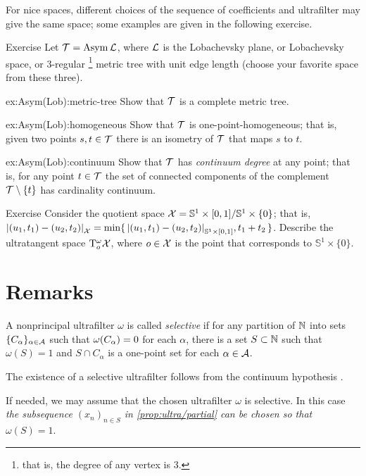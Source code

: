 For nice spaces, different choices of the sequence of coefficients and ultrafilter may give the same space; 
some examples are given in the following exercise.

\begin{thm}{Exercise}\label{ex:Asym(Lob)}
Let $\mathcal{T}=\mathop{\rm Asym}\nolimits\mathcal{L}$, where $\mathcal{L}$ is the Lobachevsky plane, or Lobachevsky space, or 3-regular%
\footnote{that is, the degree of any vertex is 3.}
metric tree with unit edge length (choose your favorite space from these three).

\begin{subthm}{ex:Asym(Lob):metric-tree}
Show that $\mathcal{T}$ is a complete metric tree.
\end{subthm}

\begin{subthm}{ex:Asym(Lob):homogeneous}
Show that $\mathcal{T}$ is one-point-homogeneous; that is, given two points $s,t\in \mathcal{T}$ there is an isometry of $\mathcal{T}$ that maps $s$ to $t$.
\end{subthm}

\begin{subthm}{ex:Asym(Lob):continuum}
Show that $\mathcal{T}$ has \emph{continuum degree} at any point;
that is, for any point $t\in \mathcal{T}$ the set of connected components of the complement $\mathcal{T}\setminus\{t\}$ has cardinality continuum.
\end{subthm}

\end{thm}


\begin{thm}{Exercise}\label{ex:T(Sx[0,1]/Sx0)}
Consider the quotient space $\mathcal{X}=\mathbb{S}^1\times[0,1]/\mathbb{S}^1\times\{0\}$;
that is, 
$\dist{(u_1,t_1)}{(u_2,t_2)}{\spc{X}}
=
\min\{\,\dist{(u_1,t_1)}{(u_2,t_2)}{\mathbb{S}^1\times[0,1]},t_1+t_2\,\}$.
Describe the ultratangent space $\mathrm{T}_o^{\omega}\mathcal{X}$, where $o\in\mathcal{X}$ is the point that corresponds to $\mathbb{S}^1\times\{0\}$.
\end{thm}

\section{Remarks}

A nonprincipal ultrafilter $\omega$ is called 
\emph{selective} if for any partition of $\mathbb{N}$ into sets $\{C_\alpha\}_{\alpha\in\mathcal{A}}$ such that $\omega(C_\alpha)\z=0$ for each $\alpha$, 
there is a set $S\subset \mathbb{N}$ such that $\omega(S)=1$ and $S\cap C_\alpha$ is a one-point set for each $\alpha\in\mathcal{A}$.

The existence of a selective ultrafilter follows from the continuum hypothesis \cite{rudin}.

If needed, we may assume that the chosen ultrafilter $\omega$ is selective.
In this case \textit{the subsequence $(x_n)_{n\in S}$ in \ref{prop:ultra/partial} can be chosen so that $\omega(S)=1$}.


